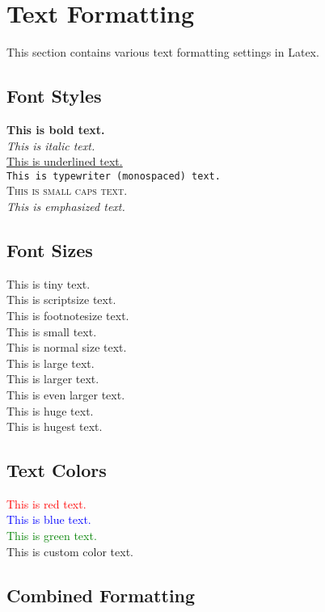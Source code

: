 \section{Text Formatting}

This section contains various text formatting settings in Latex.

\subsection{Font Styles}

\textbf{This is bold text.}\\
\textit{This is italic text.}\\
\underline{This is underlined text.}\\
\texttt{This is typewriter (monospaced) text.}\\
\textsc{This is small caps text.}\\
\emph{This is emphasized text.}

\subsection{Font Sizes}

\tiny{This is tiny text.}\\
\scriptsize{This is scriptsize text.}\\
\footnotesize{This is footnotesize text.}\\
\small{This is small text.}\\
\normalsize{This is normal size text.}\\
\large{This is large text.}\\
\Large{This is larger text.}\\
\LARGE{This is even larger text.}\\
\huge{This is huge text.}\\
\Huge{This is hugest text.}

\subsection{Text Colors}
\normalsize
\textcolor{red}{This is red text.}\\
\textcolor{blue}{This is blue text.}\\
\textcolor{green}{This is green text.}\\
\textcolor{codehighlight}{This is custom color text.}

\subsection{Combined Formatting}

